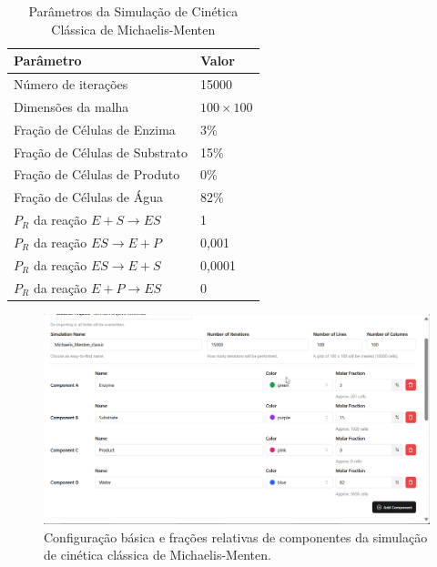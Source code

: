 \documentclass[12pt,oneside]{report}
\begin{document}
\begin{table}[H]
    \centering
    \caption{Parâmetros da Simulação de Cinética Clássica de Michaelis-Menten}
    \vspace{0.2cm}
    \begin{tabularx}{\textwidth}{X m{5cm}}
        \hline
        \textbf{Parâmetro}                     & \textbf{Valor}   \\
        \hline
        Número de iterações                    & 15000            \\
        Dimensões da malha                     & $100 \times 100$ \\
        Fração de Células de Enzima            & 3\%              \\
        Fração de Células de Substrato         & 15\%             \\
        Fração de Células de Produto           & 0\%              \\
        Fração de Células de Água              & 82\%             \\
        $P_R$ da reação $E + S \rightarrow ES$ & 1                \\
        $P_R$ da reação $ES \rightarrow E + P$ & 0{,}001          \\
        $P_R$ da reação $ES \rightarrow E + S$ & 0{,}0001         \\
        $P_R$ da reação $E + P \rightarrow ES$ & 0                \\
        \hline
    \end{tabularx}
    \vspace{0.2cm}
    \label{tab:params_michaelis_menten}
\end{table}

\begin{figure}[H]
    \centering
    \includegraphics[width=1\textwidth]{img/basic_MM.png}
    \caption{\small Configuração básica e frações relativas de componentes da simulação de cinética clássica de Michaelis-Menten.}
    \label{fig:michaelis_menten}
\end{figure}
\end{document}

